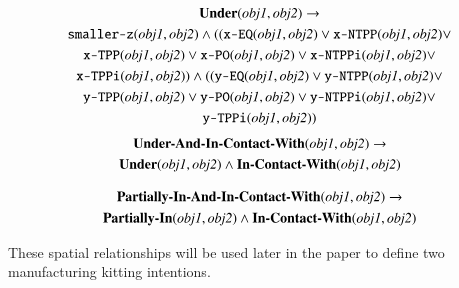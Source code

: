 \documentclass[preprint,12pt]{elsarticle}
\begin{document}
\begin{gather}
\label{eq:under}
\textbf{Under}(\textit{obj1}, \textit{obj2}) \rightarrow \\
\texttt{smaller-z}(\textit{obj1}, \textit{obj2}) \wedge ((\texttt{x-EQ}(\textit{obj1}, \textit{obj2}) \vee \texttt{x-NTPP}(\textit{obj1}, \textit{obj2}) \vee  \notag\\
\texttt{x-TPP}(\textit{obj1}, \textit{obj2}) \vee \texttt{x-PO}(\textit{obj1}, \textit{obj2}) \vee \texttt{x-NTPPi}(\textit{obj1}, \textit{obj2}) \vee  \notag\\
\texttt{x-TPPi}(\textit{obj1}, \textit{obj2})) \wedge ((\texttt{y-EQ}(\textit{obj1}, \textit{obj2}) \vee \texttt{y-NTPP}(\textit{obj1}, \textit{obj2}) \vee  \notag\\
\texttt{y-TPP}(\textit{obj1}, \textit{obj2}) \vee \texttt{y-PO}(\textit{obj1}, \textit{obj2}) \vee \texttt{y-NTPPi}(\textit{obj1}, \textit{obj2}) \vee  \notag\\
\texttt{y-TPPi}(\textit{obj1}, \textit{obj2})) \notag
\end{gather}
\begin{gather}
\label{eq:Under-And-In-Contact-With}
\textbf{Under-And-In-Contact-With}(\textit{obj1}, \textit{obj2}) \rightarrow \\
\textbf{Under}(\textit{obj1}, \textit{obj2}) \wedge \textbf{In-Contact-With}(\textit{obj1}, \textit{obj2})\notag
\end{gather}

\begin{gather}
\label{eq:Partially-In-And-In-Contact-With}
\textbf{Partially-In-And-In-Contact-With}(\textit{obj1}, \textit{obj2}) \rightarrow\\
\textbf{Partially-In}(\textit{obj1}, \textit{obj2}) \wedge \textbf{In-Contact-With}(\textit{obj1}, \textit{obj2})\notag
\end{gather}

These spatial relationships will be used later in the paper to define two manufacturing kitting intentions.
\end{document}
